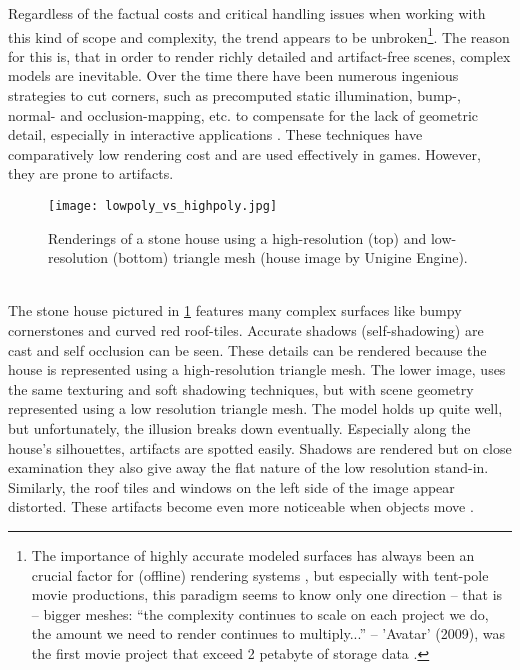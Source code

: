 Regardless of the factual costs and critical handling issues when working with this kind of scope and complexity, the trend appears to be unbroken\footnote{ 
The importance of highly accurate modeled surfaces has always been an crucial factor for (offline) rendering systems \citep[cf.][]{Cook1987}, but especially with tent-pole movie productions, this paradigm seems to know only one direction -- that is -- bigger meshes: ``the complexity continues to scale on each project we do, the amount we need to render continues to multiply...'' -- 'Avatar' (2009), was the first movie project that exceed 2 petabyte of storage data \citep[Martin Hill, head of shading at Weta Digital, cited in:][]{NVidia2009}.}.
The reason for this is, that in order to render richly detailed and artifact-free scenes, complex models are inevitable.
Over the time there have been numerous ingenious strategies to cut corners, such as precomputed static illumination, bump-, normal- and occlusion-mapping, etc. to compensate for the lack of geometric detail, especially in interactive applications \citep[cf.][]{Akenine-Moller2008}.
These techniques have comparatively low rendering cost and are used effectively in games.
However, they are prone to artifacts.
\begin{figure}[ht]
\centering
\texttt{[image: lowpoly\_vs\_highpoly.jpg]}
\caption{Renderings of a stone house using a high-resolution (top) and low-resolution (bottom) triangle mesh (house image by Unigine Engine).}
\label{fig:lowpoly_vs_highpoly}
\end{figure}\\
The stone house pictured in \ref{fig:lowpoly_vs_highpoly} features many complex surfaces like bumpy cornerstones and curved red roof-tiles.
Accurate shadows (self-shadowing) are cast and self occlusion can be seen.
These details can be rendered because the house is represented using a high-resolution triangle mesh.
The lower image, uses the same texturing and soft shadowing techniques, but with scene geometry represented using a low resolution triangle mesh.
The model holds up quite well, but unfortunately, the illusion breaks down eventually.
Especially along the house’s silhouettes, artifacts are spotted easily.
Shadows are rendered but on close examination they also give away the flat nature of the low resolution stand-in.
Similarly, the roof tiles and windows on the left side of the image appear distorted.
These artifacts become even more noticeable when objects move \citep[cf.][p.2-4]{Fatahalian2011}.\\
